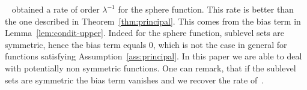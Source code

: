 
\begin{rmq} ~\cite{ppsnkbest} obtained a rate of order $\lambda^{-1}$ for the sphere function. This rate is better than the one described in Theorem~\ref{thm:principal}. This comes from the bias term in Lemma~\ref{lem:condit-upper}. Indeed for the sphere function, sublevel sets are symmetric, hence the bias term equals $0$, which is not the case in general for functions satisfying Assumption~\ref{ass:principal}. In this paper we are able to deal with potentially non symmetric functions. One can remark, that if the sublevel sets are symmetric the bias term vanishes and we recover the rate of~\cite{ppsnkbest}.
\end{rmq}
